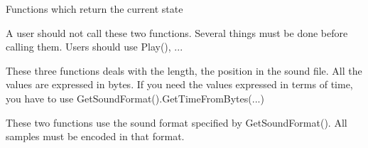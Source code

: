 Functions which return the current state


\label{wxsoundfilestreamispaused}



\label{wxsoundfilestreamstartproduction}


A user should not call these two functions.
Several things must be done before calling them.
Users should use Play(), ... 


\label{wxsoundfilestreamstopproduction}



\label{wxsoundfilestreamgetlength}


These three functions deals with the length, the position in the sound file.
All the values are expressed in bytes. If you need the values expressed
in terms of time, you have to use GetSoundFormat().GetTimeFromBytes(...)


\label{wxsoundfilestreamgetposition}



\label{wxsoundfilestreamsetposition}



\label{wxsoundfilestreamread}


These two functions use the sound format specified by GetSoundFormat().
All samples must be encoded in that format. 


\label{wxsoundfilestreamwrite}



\label{wxsoundfilestreamsetsoundformat}


